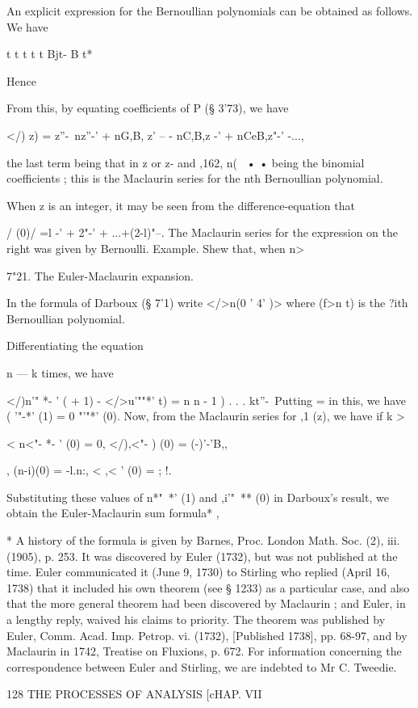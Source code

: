 An explicit expression for the Bernoullian polynomials can be obtained
as follows. We have

t t t t t Bjt- B t*

Hence

From this, by equating coefficients of P (§ 3'73), we have

</) z) = z''-\ nz''-' + nG,B, z' -- - nC,B,z -' + nCeB,z"-' -...,

the last term being that in z or z- and ,162, n( \, • • being the
binomial coefficients ; this is the Maclaurin series for the nth
Bernoullian polynomial.

When z is an integer, it may be seen from the difference-equation that

 / (0)/ =l -' + 2"-' + ...+(2-l)"--. The Maclaurin series for the
expression on the right was given by Bernoulli. Example. Shew that,
when n>\,

7"21. The Euler-Maclaurin expansion.

In the formula of Darboux (§ 7'1) write </>n(0 ' 4' )> where (f>n t)
is the ?ith Bernoullian polynomial.

Differentiating the equation

n — k times, we have

</)n'" *- ' ( + 1) - </>u'""*' t) = n n - 1 ) . . . kt''-\ Putting =
in this, we have ( '"-*' (1) = 0 "'"*' (0). Now, from the Maclaurin
series for ,1 (z), we have if k >

< n<"- *- ' (0) = 0, </),<"- ) (0) = (-)'-'B,,

 , (n-i)(0) = -l.n:, < ,< ' (0) = ; !.

Substituting these values of n*"~*' (1) and ,i'"~** (0) in Darboux's
result, we obtain the Euler-Maclaurin sum formula* ,

* A history of the formula is given by Barnes, Proc. London Math. Soc.
(2), iii. (1905), p. 253. It was discovered by Euler (1732), but was
not published at the time. Euler communicated it (June 9, 1730) to
Stirling who replied (April 16, 1738) that it included his own theorem
(see § 1233) as a particular case, and also that the more general
theorem had been discovered by Maclaurin ; and Euler, in a lengthy
reply, waived his claims to priority. The theorem was published by
Euler, Comm. Acad. Imp. Petrop. vi. (1732), [Published 1738], pp.
68-97, and by Maclaurin in 1742, Treatise on Fluxions, p. 672. For
information concerning the correspondence between Euler and Stirling,
we are indebted to Mr C. Tweedie.

128 THE PROCESSES OF ANALYSIS [cHAP. VII

